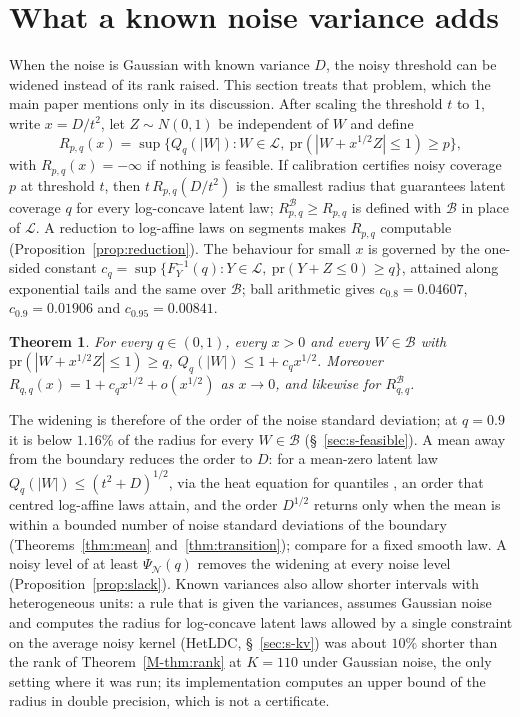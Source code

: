 \documentclass[12pt]{article}
\renewcommand{\_}{\usc\allowbreak}
\newtheorem{theorem}{Theorem}
\theoremstyle{definition}
\numberwithin{equation}{section}
\newcommand{\pr}{\mathrm{pr}}
\newcommand{\LC}{\mathcal{L}}
\newcommand{\B}{\mathcal{B}}
\newcommand{\N}{\mathcal{N}}
\begin{document}
\section{What a known noise variance adds}\label{sec:s-known}

When the noise is Gaussian with known variance $D$, the noisy threshold can be widened instead of its rank raised. This section treats that problem, which the main paper mentions only in its discussion. After scaling the threshold $t$ to $1$, write $x = D/t^2$, let $Z \sim N(0,1)$ be independent of $W$ and define
\begin{equation}\label{eq:R}
R_{p,q}(x) = \sup\{ Q_q(|W|) : W \in \LC,\ \pr(|W + x^{1/2}Z| \le 1) \ge p \},
\end{equation}
with $R_{p,q}(x) = -\infty$ if nothing is feasible. If calibration certifies noisy coverage $p$ at threshold $t$, then $t\,R_{p,q}(D/t^2)$ is the smallest radius that guarantees latent coverage $q$ for every log-concave latent law; $R^{\B}_{p,q} \ge R_{p,q}$ is defined with $\B$ in place of $\LC$. A reduction to log-affine laws on segments makes $R_{p,q}$ computable (Proposition~\ref{prop:reduction}). The behaviour for small $x$ is governed by the one-sided constant $c_q = \sup\{F_Y^{-1}(q) : Y \in \LC,\ \pr(Y + Z \le 0) \ge q\}$, attained along exponential tails and the same over $\B$; ball arithmetic gives $c_{0.8} = 0.04607$, $c_{0.9} = 0.01906$ and $c_{0.95} = 0.00841$.

\begin{theorem}\label{thm:small}
For every $q \in (0,1)$, every $x > 0$ and every $W \in \B$ with $\pr(|W + x^{1/2}Z| \le 1) \ge q$, $Q_q(|W|) \le 1 + c_q x^{1/2}$. Moreover $R_{q,q}(x) = 1 + c_q x^{1/2} + o(x^{1/2})$ as $x \to 0$, and likewise for $R^{\B}_{q,q}$.
\end{theorem}

The widening is therefore of the order of the noise standard deviation; at $q = 0.9$ it is below $1.16\%$ of the radius for every $W \in \B$ (\S~\ref{sec:s-feasible}). A mean away from the boundary reduces the order to $D$: for a mean-zero latent law $Q_q(|W|) \le (t^2 + D)^{1/2}$, via the heat equation for quantiles \citep{steinbrecher2008}, an order that centred log-affine laws attain, and the order $D^{1/2}$ returns only when the mean is within a bounded number of noise standard deviations of the boundary (Theorems~\ref{thm:mean} and~\ref{thm:transition}); compare \citet{jochmans2024} for a fixed smooth law. A noisy level of at least $\Psi_{\N}(q)$ removes the widening at every noise level (Proposition~\ref{prop:slack}). Known variances also allow shorter intervals with heterogeneous units: a rule that is given the variances, assumes Gaussian noise and computes the radius for log-concave latent laws allowed by a single constraint on the average noisy kernel (HetLDC, \S~\ref{sec:s-kv}) was about $10\%$ shorter than the rank of Theorem~\ref{M-thm:rank} at $K = 110$ under Gaussian noise, the only setting where it was run; its implementation computes an upper bound of the radius in double precision, which is not a certificate.
\end{document}
